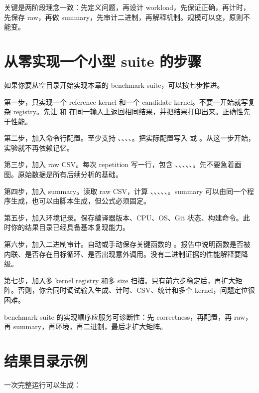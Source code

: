 关键是两阶段理念一致：先定义问题，再设计 workload，先保证正确，再计时，先保存 raw，再做 summary，先审计二进制，再解释机制。规模可以变，原则不能变。

\section{从零实现一个小型 suite 的步骤}

如果你要从空目录开始实现本章的 benchmark suite，可以按七步推进。

第一步，只实现一个 reference kernel 和一个 candidate kernel。不要一开始就写复杂 registry。先让  和  在同一输入上返回相同结果，并把结果打印出来。正确性先于性能。

第二步，加入命令行配置。至少支持 、、、、。把实际配置写入  或 。从这一步开始，实验就不再依赖记忆。

第三步，加入 raw CSV。每次 repetition 写一行，包含 、、、、、。先不要急着画图。原始数据是所有后续分析的基础。

第四步，加入 summary。读取 raw CSV，计算 、、、、、。summary 可以由同一个程序生成，也可以由脚本生成，但公式必须固定。

第五步，加入环境记录。保存编译器版本、CPU、OS、Git 状态、构建命令。此时你的结果目录已经具备基本复现能力。

第六步，加入二进制审计。自动或手动保存关键函数的 。报告中说明函数是否被内联、是否存在目标循环、是否出现意外调用。没有二进制证据的性能解释要降级。

第七步，加入多 kernel registry 和多 size 扫描。只有前六步稳定后，再扩大矩阵。否则，你会同时调试输入生成、计时、CSV、统计和多个 kernel，问题定位很困难。

\begin{keyidea}
benchmark suite 的实现顺序应服务可诊断性：先 correctness，再配置，再 raw，再 summary，再环境，再二进制，最后才扩大矩阵。
\end{keyidea}

\section{结果目录示例}

一次完整运行可以生成：

